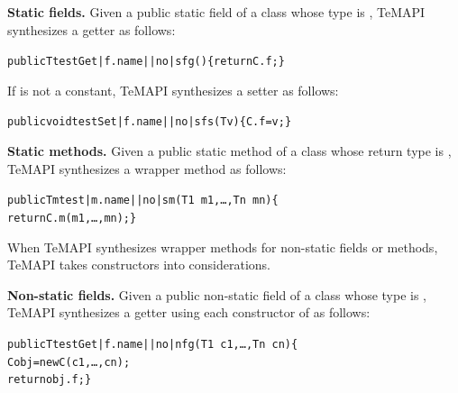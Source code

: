 \textbf{Static fields.} Given a public static field  of a class  whose type is , TeMAPI synthesizes a getter as follows:

\begin{CodeOut}\vspace*{-1.5ex}
\begin{alltt}
 public T testGet|f.name||no|sfg()\{ return C.f; \}
\end{alltt}
\end{CodeOut}\vspace*{-1.5ex}

If  is not a constant, TeMAPI synthesizes a setter as follows:

\begin{CodeOut}\vspace*{-1.5ex}
\begin{alltt}
 public void testSet|f.name||no|sfs(T v)\{ C.f = v; \}
\end{alltt}
\end{CodeOut}\vspace*{-1.5ex}

\textbf{Static methods.} Given a public static method  of a class  whose return type is , TeMAPI synthesizes a wrapper method as follows:

\begin{CodeOut}\vspace*{-1.5ex}
\begin{alltt}
 public Tm test|m.name||no|sm(T1\ m1,\ldots, Tn\ mn)\{
   return C.m(m1,\ldots, mn); \}
\end{alltt}
\end{CodeOut}\vspace*{-1.5ex}

When TeMAPI synthesizes wrapper methods for non-static fields or methods, TeMAPI takes constructors into considerations.

\textbf{Non-static fields.} Given a public non-static field  of a class  whose type is , TeMAPI synthesizes a getter using each constructor  of  as follows:

\begin{CodeOut}\vspace*{-1.5ex}
\begin{alltt}
 public T testGet|f.name||no|nfg(T1\ c1,\ldots, Tn\ cn)\{
    C obj = new C(c1,\ldots, cn);
    return obj.f; \}
\end{alltt}
\end{CodeOut}\vspace*{-1.5ex}

